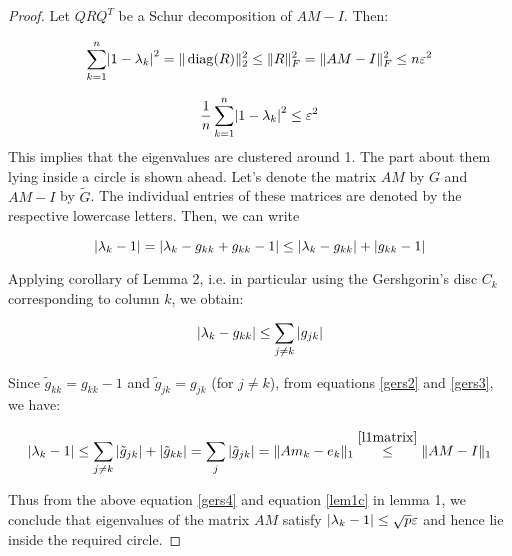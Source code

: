 \documentclass[paper=A4, fontsize=11pt]{scrartcl}
\let\originalleft\left
\let\originalright\right
\renewcommand{\left}{\mathopen{}\mathclose\bgroup\originalleft}
\renewcommand{\right}{\aftergroup\egroup\originalright}
\newcommand{\dk}{g_{kk}} %
\newcommand{\dktil}{\tilde{g}_{kk}} %
\begin{document}
\begin{proof}
	
Let $Q R Q^{T}$ be a Schur decomposition of $A M-I$. Then:

\begin{equation}
\sum_{k=1}^{n}\left|1-\lambda_{k}\right|^{2}=\|\operatorname{diag}(R)\|_{2}^{2} \leq\|R\|_{F}^{2}=\|A M-I\|_{F}^{2} \leq n \varepsilon^{2}
\end{equation}

\begin{equation}
\frac{1}{n} \sum_{k=1}^{n}\left|1-\lambda_{k}\right|^{2} \leq \varepsilon^{2}
\end{equation}
This implies that the eigenvalues are clustered around 1. The part about them lying inside a circle is shown ahead. Let's denote the matrix $A M$ by $G$ and $A M - I$ by $\tilde{G}$. The individual entries of these matrices are denoted by the respective lowercase letters. Then, we can write

\begin{equation}\label{gers2}
\left|\lambda_{k} - 1 \right| = \left|\lambda_{k} - \dk  + \dk - 1 \right| \leq \left|\lambda_{k} - \dk \right|  + \left|\dk - 1 \right| %
\end{equation}

Applying corollary of Lemma 2, i.e. in particular using the Gershgorin's disc $C_k$ corresponding to column $k$, we obtain:

\begin{equation}\label{gers3}
\left|\lambda_{k} - \dk \right| \leq \sum_{j \neq k}\, \left|g_{j k}\right|
\end{equation}

Since $ \dktil = \dk - 1 $ and $\tilde{g}_{j k} = g_{j k}$ (for $j\neq k$), from equations \eqref{gers2} and \eqref{gers3}, we have:  

\begin{equation}\label{gers4}
\left|\lambda_{k} - 1 \right| \leq \sum_{j \neq k}\, \left|\tilde{g}_{j k}\right| + \left|\dktil\right| = \sum_{j }\, \left|\tilde{g}_{j k}\right| = \|A m_k -e_k\|_{1} \overset{\eqref{l1matrix}}{\leq} \|A M-I\|_{1}
\end{equation}

Thus from the above equation \eqref{gers4} and equation \eqref{lem1c} in lemma 1, we conclude that eigenvalues of the matrix $A M$ satisfy $ \left|\lambda_{k} - 1 \right| \leq \sqrt{p} \varepsilon$ and hence lie inside the required circle.
\end{proof}
\end{document}
